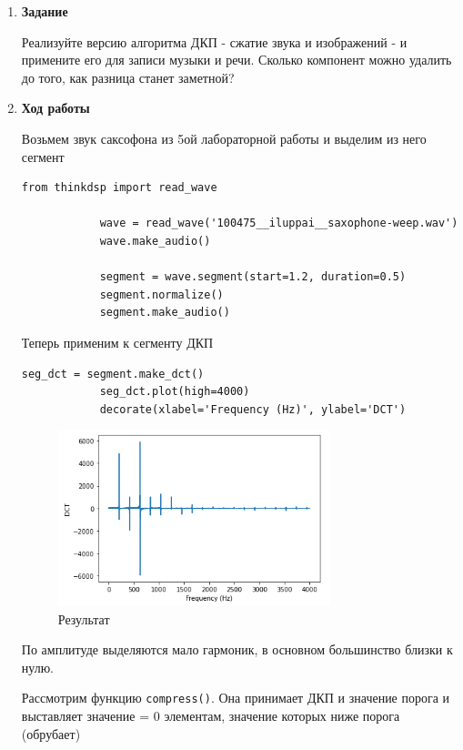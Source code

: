 \documentclass[a4paper,12pt]{article}
\begin{document}
	\begin{enumerate} 
			
		\item \textbf{Задание}
			
		Реализуйте версию алгоритма ДКП - сжатие звука и изображений - и примените его для записи музыки и речи. Сколько компонент можно удалить до того, как разница станет заметной?
			
		\item \textbf{Ход работы}
			
		Возьмем звук саксофона из 5ой лабораторной работы и выделим из него сегмент
		\begin{lstlisting}[caption=Сегмент звука]
			from thinkdsp import read_wave
			
			wave = read_wave('100475__iluppai__saxophone-weep.wav')
			wave.make_audio()
			
			segment = wave.segment(start=1.2, duration=0.5)
			segment.normalize()
			segment.make_audio()
		\end{lstlisting}
	
		Теперь применим к сегменту ДКП
		\begin{lstlisting}[caption=Применяем ДКП]
			seg_dct = segment.make_dct()
			seg_dct.plot(high=4000)
			decorate(xlabel='Frequency (Hz)', ylabel='DCT')
		\end{lstlisting}
		\begin{figure}[H]
			\centering
			\includegraphics[width=0.75\textwidth]{2_1.png}
			\caption{Результат}
			\label{fig:2.1}
		\end{figure}
	
		По амплитуде выделяются мало гармоник, в основном большинство близки к нулю.
		
		Рассмотрим функцию \texttt{compress()}. Она принимает ДКП и значение порога и выставляет значение = 0 элементам, значение которых ниже порога (обрубает)
		

\end{enumerate}
\end{document}
